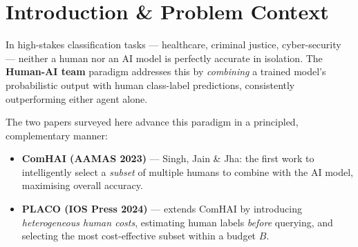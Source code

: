 \documentclass[10pt,twocolumn]{article}
\begin{document}

\section{Introduction \& Problem Context}

In high-stakes classification tasks --- healthcare, criminal justice,
cyber-security --- neither a human nor an AI model is perfectly accurate
in isolation. The \textbf{Human-AI team} paradigm addresses this by
\emph{combining} a trained model's probabilistic output with human
class-label predictions, consistently outperforming either agent alone.

The two papers surveyed here advance this paradigm in a principled,
complementary manner:

\begin{itemize}[leftmargin=*,nosep,itemsep=2pt]
  \item \textbf{ComHAI (AAMAS 2023)} --- Singh, Jain \& Jha: the first
    work to intelligently select a \emph{subset} of multiple humans to
    combine with the AI model, maximising overall accuracy.
  \item \textbf{PLACO (IOS Press 2024)} --- extends ComHAI by
    introducing \emph{heterogeneous human costs}, estimating human labels
    \emph{before} querying, and selecting the most cost-effective subset
    within a budget $B$.
\end{itemize}
\end{document}
